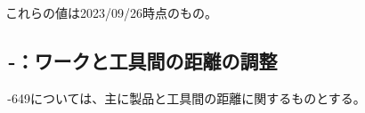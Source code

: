 \begin{hosoku}
これらの値は2023/09/26時点のもの。
\end{hosoku}



\clearpage

\subsection{\,-：ワークと工具間の距離の調整}
\,-\ttNum649については、主に製品と工具間の距離に関するものとする。\\

